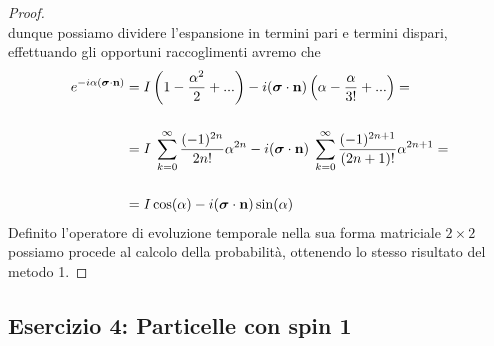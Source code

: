 \begin{proof}
\begin{equation*}
\end{equation*}
dunque possiamo dividere l'espansione in termini pari e termini dispari, effettuando gli opportuni raccoglimenti avremo che 
\begin{align*}
	e^{-i \alpha (\boldsymbol{\sigma} \cdot \bold{n})} = & \; I \left (1-\frac{\alpha^2}{2} + ... \right  ) - i(\boldsymbol{\sigma} \cdot \bold{n}) \left ( \alpha - \frac{\alpha}{3!} + ...\right ) =  \\[0.5cm]
	 = & \; I \; \sum_{k=0}^{\infty} \frac{(-1)^{2n}}{2n!}\alpha^{2n}  -i(\boldsymbol{\sigma} \cdot \bold{n}) \; \sum_{k=0}^{\infty} \frac{(-1)^{2n+1}}{(2n+1)!} \alpha^{2n+1} = \\[0.5cm]
	 = & \; I\cos(\alpha) - i(\boldsymbol{\sigma} \cdot \bold{n}) \sin(\alpha)
\end{align*}
Definito l'operatore di evoluzione temporale nella sua forma matriciale $2 \times 2$ possiamo procede al
\newpage
calcolo della probabilit\`a, ottenendo lo stesso risultato del metodo 1.

\end{proof}

\subsection{Esercizio 4: Particelle con spin 1}

